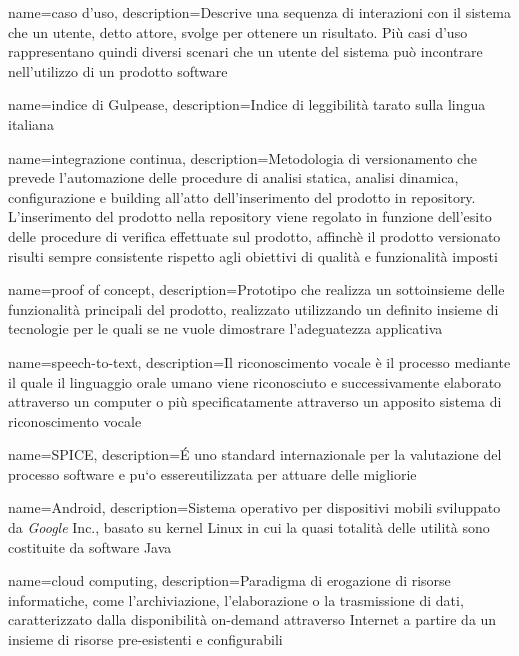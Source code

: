 {
	name=caso d'uso,
	description={Descrive una sequenza di interazioni con il sistema che un utente, detto attore, svolge per ottenere un risultato.  Più casi d’uso rappresentano quindi diversi scenari che un utente del sistema può incontrare nell’utilizzo di un prodotto software}
}

{
	name=indice di Gulpease,
	description={Indice di leggibilità tarato sulla lingua italiana}
}

{
	name=integrazione continua,
	description={Metodologia di versionamento che prevede l’automazione delle procedure di analisi statica, analisi dinamica, configurazione e building all’atto dell’inserimento del prodotto in repository. L’inserimento del prodotto nella repository viene regolato in funzione dell’esito delle procedure di verifica effettuate sul prodotto, affinchè il prodotto versionato risulti sempre consistente rispetto agli obiettivi di qualità e funzionalità imposti}
}

{
	name=proof of concept,
	description={Prototipo che realizza un sottoinsieme delle funzionalità principali del prodotto, realizzato utilizzando un definito insieme di tecnologie per le quali se ne vuole  dimostrare l’adeguatezza applicativa}
}

{
	name=speech-to-text,
	description={Il riconoscimento vocale è il processo mediante il quale il linguaggio orale umano viene riconosciuto e successivamente elaborato attraverso un computer o più specificatamente attraverso un apposito sistema di riconoscimento vocale}
}

{
	name=SPICE,
	description={\'E uno standard internazionale per la valutazione del processo software e pu`o essereutilizzata per attuare delle migliorie}
}

{
	name=Android,
	description={Sistema operativo per dispositivi mobili sviluppato da \emph{Google} Inc., basato su kernel Linux in cui la quasi totalità delle utilità sono costituite da software Java}
}

{
	name=cloud computing,
	description={Paradigma di erogazione di risorse informatiche, come l’archiviazione, l’elaborazione o la trasmissione di dati, caratterizzato dalla disponibilità on-demand attraverso Internet a partire da un insieme di risorse pre-esistenti e configurabili}
}

